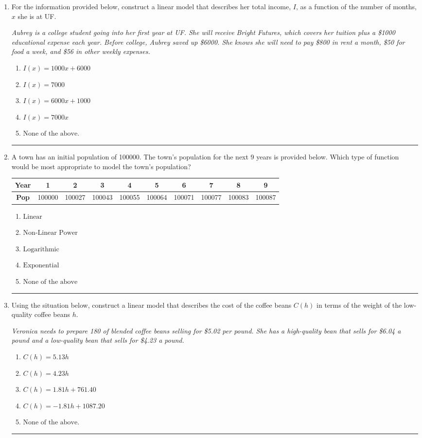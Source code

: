 \documentclass[14pt]{extbook}
\newcommand{\litem}[1]{\item#1\hspace*{-1cm}\rule{\textwidth}{0.4pt}}
\begin{document}
\begin{enumerate}
{\begin{enumerate}[label=\Alph*.]
\end{enumerate} }
\litem{
For the information provided below, construct a linear model that describes her total income, $I$, as a function of the number of months, $x$ she is at UF.
\begin{center}
    \textit{ Aubrey is a college student going into her first year at UF. She will receive Bright Futures, which covers her tuition plus a \$1000 educational expense each year. Before college, Aubrey saved up \$6000. She knows she will need to pay \$800 in rent a month, \$50 for food a week, and \$56 in other weekly expenses. }
\end{center}
\begin{enumerate}[label=\Alph*.]
\item \( I(x) = 1000 x + 6000 \)
\item \( I(x) = 7000 \)
\item \( I(x) = 6000 x + 1000 \)
\item \( I(x) = 7000 x \)
\item \( \text{None of the above.} \)

\end{enumerate} }
\litem{
A town has an initial population of 100000. The town's population for the next 9 years is provided below. Which type of function would be most appropriate to model the town's population?

\begin{tabular}{c|c|c|c|c|c|c|c|c|c}
\textbf{Year} &1 &2 &3 &4 &5 &6 &7 &8 &9\tabularnewline \hline
\textbf{Pop} &100000 &100027 &100043 &100055 &100064 &100071 &100077 &100083 &100087\end{tabular}\begin{enumerate}[label=\Alph*.]
\item \( \text{Linear} \)
\item \( \text{Non-Linear Power} \)
\item \( \text{Logarithmic} \)
\item \( \text{Exponential} \)
\item \( \text{None of the above} \)

\end{enumerate} }
\litem{
Using the situation below, construct a linear model that describes the cost of the coffee beans $C(h)$ in terms of the weight of the low-quality coffee beans $h$.
\begin{center}
    \textit{ Veronica needs to prepare 180 of blended coffee beans selling for \$5.02 per pound. She has a high-quality bean that sells for \$6.04 a pound and a low-quality bean that sells for \$4.23 a pound. }
\end{center}
\begin{enumerate}[label=\Alph*.]
\item \( C(h) = 5.13 h \)
\item \( C(h) = 4.23 h \)
\item \( C(h) = 1.81 h + 761.40 \)
\item \( C(h) = -1.81 h + 1087.20 \)
\item \( \text{None of the above.} \)


\end{enumerate}}
\end{enumerate}
\end{document}
